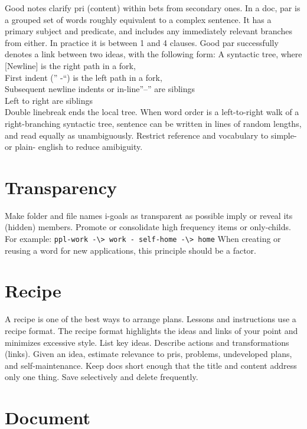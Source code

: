 \documentclass[
]{book}
\begin{document}
Good notes clarify pri (content) within bets from secondary ones.
In a doc, par is a grouped set of words roughly equivalent to a complex sentence.
It has a primary subject and predicate, and includes any immediately relevant branches from either.
In practice it is between 1 and 4 clauses.
Good par successfully denotes a link between two ideas, with the following form:
A syntactic tree, where\\
{[}Newline{]} is the right path in a fork,\\
First indent ('' -``) is the left path in a fork,\\
Subsequent newline indents or in-line''--'' are siblings\\
Left to right are siblings\\
Double linebreak ends the local tree.
When word order is a left-to-right walk of a right-branching syntactic tree, sentence can be written in lines of random lengths, and read equally as unambiguously.
Restrict reference and vocabulary to simple- or plain- english to reduce amibiguity.

\hypertarget{transparency}{%
\section{Transparency}\label{transparency}}

Make folder and file names i-goals as transparent as possible imply or reveal its (hidden) members.
Promote or consolidate high frequency items or only-childs.
For example: \texttt{ppl-work\ -\textbackslash{}\textgreater{}\ work\ -\ self-home\ -\textbackslash{}\textgreater{}\ home}
When creating or reusing a word for new applications, this principle should be a factor.

\hypertarget{recipe}{%
\section{Recipe}\label{recipe}}

A recipe is one of the best ways to arrange plans.
Lessons and instructions use a recipe format.
The recipe format highlights the ideas and links of your point and minimizes excessive style.
List key ideas.
Describe actions and transformations (links).
Given an idea, estimate relevance to pris, problems, undeveloped plans, and self-maintenance.
Keep docs short enough that the title and content address only one thing.
Save selectively and delete frequently.

\hypertarget{document}{%
\section{Document}\label{document}}
\end{document}
